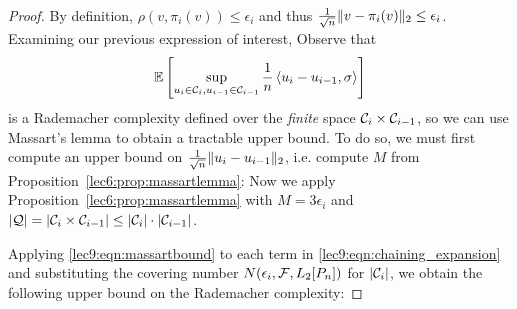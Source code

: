 \begin{proof}
    By definition, $\rho(v, \pi_i(v)) \le \epsilon_i$ and thus $\frac 1 {\sqrt n} \|v - \pi_i(v)\|_2 \le \epsilon_i$. Examining our previous expression of interest, 
    Observe that
    \begin{equation}
        \operatorname*{\mathbb{E}}\left[ \sup_{u_i \in \mathcal C_i, u_{i - 1} \in \mathcal C_{i - 1}} \frac 1 n\left\langle u_i-u_{i - 1}, \sigma\right\rangle\right]
    \end{equation}
    is a Rademacher complexity defined over the \emph{finite} space $\mathcal C_i \times \mathcal C_{i - 1}$, so we can use Massart's lemma to obtain a tractable upper bound. To do so, we must first compute an upper bound on $\frac{1}{\sqrt{n}} \|u_i - u_{i - 1}\|_2$, i.e. compute $M$ from Proposition~\ref{lec6:prop:massartlemma}:
    Now we apply Proposition~\ref{lec6:prop:massartlemma} with $M = 3 \epsilon_i$ and $\left\lvert\mathcal Q\right\rvert = \left\lvert\mathcal C_i \times \mathcal C_{i - 1}\right\rvert \leq \left\lvert\mathcal C_i\right\rvert \cdot \left\lvert\mathcal C_{i - 1}\right\rvert$.
    
    Applying \eqref{lec9:eqn:massartbound} to each term in \eqref{lec9:eqn:chaining_expansion} and substituting the covering number $N(\epsilon_i, \mathcal F, L_2[P_n])$ for $|\mathcal C_i|$, we obtain the following upper bound on the Rademacher complexity:
    

\end{proof}
